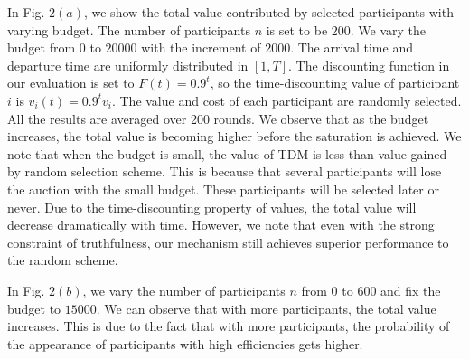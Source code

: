 \documentclass[conference,compsocconf,letterpaper,10pt]{IEEEtran}
\begin{document}
In Fig. $2(a)$, we show the total value contributed by selected participants with varying budget. The number of participants $n$ is set to be $200$. We vary the budget from $0$ to $20000$ with the increment of $2000$. The arrival time and departure time are uniformly distributed in $[1,T]$. The discounting function in our evaluation is set to $F(t) = 0.9^t$, so the time-discounting value of participant $i$ is $v_i(t) = 0.9^tv_i$. The value and cost of each participant are randomly selected. All the results are averaged over 200 rounds. We observe that as the budget increases, the total value is becoming higher before the saturation is achieved. We note that when the budget is small, the value of TDM is less than value gained by random selection scheme. This is because that several participants will lose the auction with the small budget. These participants will be selected later or never. Due to the time-discounting property of values, the total value will decrease dramatically with time. However, we note that even with the strong constraint of truthfulness, our mechanism still achieves superior performance to the random scheme.

In Fig. $2(b)$, we vary the number of participants $n$ from $0$ to $600$ and fix the budget to $15000$. We can observe that with more participants, the total value increases. This is due to the fact that with more participants, the probability of the appearance of participants with high efficiencies gets higher.
\end{document}
